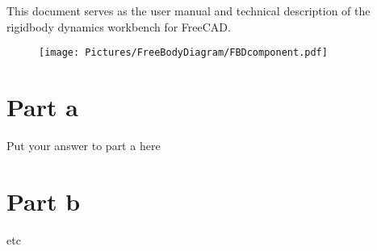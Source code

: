 \documentclass{article}
\begin{document}
This document serves as the user manual and technical description of the rigidbody dynamics workbench for FreeCAD.

\begin{figure}
  \texttt{[image: Pictures/FreeBodyDiagram/FBDcomponent.pdf]}

\end{figure}


\section*{Part a}

Put your answer to part a here

\section*{Part b}

etc
\end{document}

